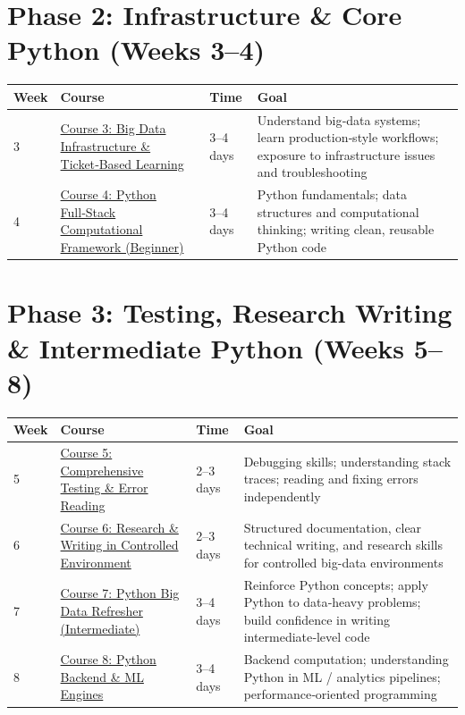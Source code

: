 \documentclass[12pt]{article}
\begin{document}
	\vspace{0.3cm}
	
	\section*{Phase 2: Infrastructure \& Core Python (Weeks 3–4)}
	
	\begin{tabularx}{\textwidth}{|X|p{3cm}|p{3cm}|X|}
		\hline
		\textbf{Week} & \textbf{Course} & \textbf{Time} & \textbf{Goal} \\
		\hline
		3 & \href{https://www.udemy.com/course/big-data-infra-admin-101-ticket-based-learning/}{Course 3: Big Data Infrastructure \& Ticket‑Based Learning} & 3–4 days & Understand big‑data systems; learn production‑style workflows; exposure to infrastructure issues and troubleshooting \\
		\hline
		4 & \href{https://www.udemy.com/course/python-full-stack-computational-framework-for-begineers-101/}{Course 4: Python Full‑Stack Computational Framework (Beginner)} & 3–4 days & Python fundamentals; data structures and computational thinking; writing clean, reusable Python code \\
		\hline
	\end{tabularx}
	
	\vspace{0.3cm}
	
	\section*{Phase 3: Testing, Research Writing \& Intermediate Python (Weeks 5–8)}
	
	\begin{tabularx}{\textwidth}{|X|p{3cm}|p{3cm}|X|}
		\hline
		\textbf{Week} & \textbf{Course} & \textbf{Time} & \textbf{Goal} \\
		\hline
		5 & \href{https://www.udemy.com/course/full-spectrum-comprehensive-testing-error-reading-101/}{Course 5: Comprehensive Testing \& Error Reading} & 2–3 days & Debugging skills; understanding stack traces; reading and fixing errors independently \\
		\hline
		6 & \href{https://www.udemy.com/course/research-writing-skills-for-essays-in-controlled-environment}{Course 6: Research \& Writing in Controlled Environment} & 2–3 days & Structured documentation, clear technical writing, and research skills for controlled big-data environments \\
		\hline
		7 & \href{https://www.udemy.com/course/refresher-python-big-data-intermediate-quiz-based-course-102/}{Course 7: Python Big Data Refresher (Intermediate)} & 3–4 days & Reinforce Python concepts; apply Python to data‑heavy problems; build confidence in writing intermediate‑level code \\
		\hline
		8 & \href{https://www.udemy.com/course/python-full-stack-and-backend-engines-for-mc-ml-engines-102/}{Course 8: Python Backend \& ML Engines} & 3–4 days & Backend computation; understanding Python in ML / analytics pipelines; performance‑oriented programming \\
		\hline
	\end{tabularx}
	
\end{document}

